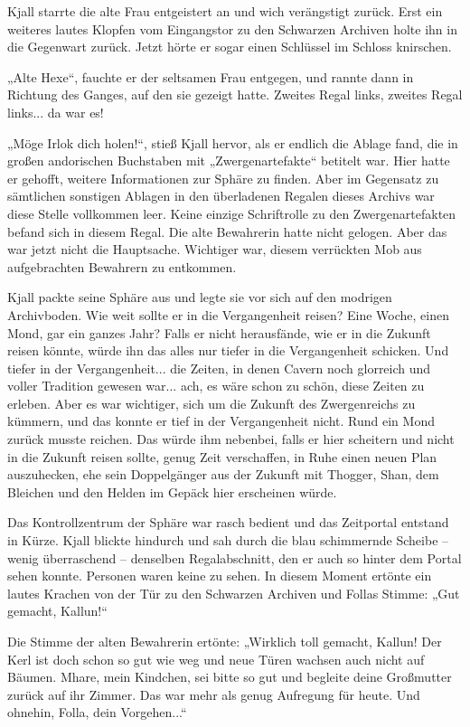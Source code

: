 \documentclass[10pt, a4paper, oneside]{book}
\begin{document}
Kjall starrte die alte Frau entgeistert an und wich verängstigt zurück. Erst ein weiteres lautes Klopfen vom Eingangstor zu den Schwarzen Archiven holte ihn in die Gegenwart zurück. Jetzt hörte er sogar einen Schlüssel im Schloss knirschen.

„Alte Hexe“, fauchte er der seltsamen Frau entgegen, und rannte dann in Richtung des Ganges, auf den sie gezeigt hatte. Zweites Regal links, zweites Regal links... da war es!

„Möge Irlok dich holen!“, stieß Kjall hervor, als er endlich die Ablage fand, die in großen andorischen Buchstaben mit „Zwergenartefakte“ betitelt war. Hier hatte er gehofft, weitere Informationen zur Sphäre zu finden. Aber im Gegensatz zu sämtlichen sonstigen Ablagen in den überladenen Regalen dieses Archivs war diese Stelle vollkommen leer. Keine einzige Schriftrolle zu den Zwergenartefakten befand sich in diesem Regal. Die alte Bewahrerin hatte nicht gelogen. Aber das war jetzt nicht die Hauptsache. Wichtiger war, diesem verrückten Mob aus aufgebrachten Bewahrern zu entkommen.

Kjall packte seine Sphäre aus und legte sie vor sich auf den modrigen Archivboden. Wie weit sollte er in die Vergangenheit reisen? Eine Woche, einen Mond, gar ein ganzes Jahr? Falls er nicht herausfände, wie er in die Zukunft reisen könnte, würde ihn das alles nur tiefer in die Vergangenheit schicken. Und tiefer in der Vergangenheit... die Zeiten, in denen Cavern noch glorreich und voller Tradition gewesen war... ach, es wäre schon zu schön, diese Zeiten zu erleben. Aber es war wichtiger, sich um die Zukunft des Zwergenreichs zu kümmern, und das konnte er tief in der Vergangenheit nicht. Rund ein Mond zurück musste reichen. Das würde ihm nebenbei, falls er hier scheitern und nicht in die Zukunft reisen sollte, genug Zeit verschaffen, in Ruhe einen neuen Plan auszuhecken, ehe sein Doppelgänger aus der Zukunft mit Thogger, Shan, dem Bleichen und den Helden im Gepäck hier erscheinen würde.

Das Kontrollzentrum der Sphäre war rasch bedient und das Zeitportal entstand in Kürze. Kjall blickte hindurch und sah durch die blau schimmernde Scheibe – wenig überraschend – denselben Regalabschnitt, den er auch so hinter dem Portal sehen konnte. Personen waren keine zu sehen. In diesem Moment ertönte ein lautes Krachen von der Tür zu den Schwarzen Archiven und Follas Stimme: „Gut gemacht, Kallun!“

Die Stimme der alten Bewahrerin ertönte: „Wirklich toll gemacht, Kallun! Der Kerl ist doch schon so gut wie weg und neue Türen wachsen auch nicht auf Bäumen. Mhare, mein Kindchen, sei bitte so gut und begleite deine Großmutter zurück auf ihr Zimmer. Das war mehr als genug Aufregung für heute. Und ohnehin, Folla, dein Vorgehen...“
\end{document}
